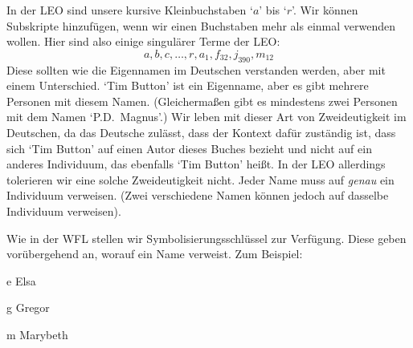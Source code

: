 In der LEO sind unsere  kursive Kleinbuchstaben `$a$' bis `$r$'. Wir können Subskripte hinzufügen, wenn wir einen Buchstaben mehr als einmal verwenden wollen. Hier sind also einige singulärer Terme der LEO:
	$$a,b,c,\ldots, r, a_1, f_{32}, j_{390}, m_{12}$$
Diese sollten wie die Eigennamen im Deutschen verstanden werden, aber mit einem Unterschied. `Tim Button' ist ein Eigenname, aber es gibt mehrere Personen mit diesem Namen. (Gleicherma{\ss}en gibt es mindestens zwei Personen mit dem Namen `P.D.\ Magnus'.) Wir leben mit dieser Art von Zweideutigkeit im Deutschen, da das Deutsche zulässt, dass der Kontext dafür zuständig ist, dass sich `Tim Button' auf einen Autor dieses Buches bezieht und nicht auf ein anderes Individuum, das ebenfalls `Tim Button' hei{\ss}t. In der LEO allerdings tolerieren wir eine solche Zweideutigkeit nicht. Jeder Name muss auf \emph{genau} ein Individuum verweisen. (Zwei verschiedene Namen können jedoch auf dasselbe Individuum verweisen).


Wie in der WFL stellen wir Symbolisierungsschlüssel zur Verfügung. Diese geben vorübergehend an, worauf ein Name verweist. Zum Beispiel:
	\begin{ekey}
		\item[e] Elsa
		\item[g] Gregor
		\item[m] Marybeth
	\end{ekey}

